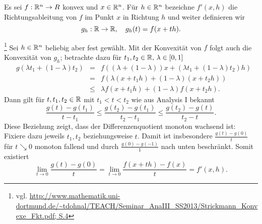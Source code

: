 Es sei $f:\mathbb{R}^n\to R$ konvex und $x\in \mathbb{R}^n$. Für $h\in \mathbb{R}^n$ bezeichne $f'(x,h)$ die Richtungsableitung von $f$ im Punkt $x$ in Richtung $h$ und
weiter definieren wir 
\begin{displaymath}
 g_h:\mathbb{R}\to\mathbb{R},\quad g_h(t)=f(x+th).
\end{displaymath}

\begin{compactenum}[(i)]
 \item \footnote{vgl. \url{http://www.mathematik.uni-dortmund.de/~tdohnal/TEACH/Seminar\_AnaIII\_SS2013/Strickmann\_Konvexe\_Fkt.pdf; S.4}}
 Sei $h\in\mathbb{R}^n$ beliebig aber fest gewählt. Mit der Konvexität von $f$ folgt auch die Konvexität von $g_h$;
 betrachte dazu für $t_1,t_2\in \mathbb{R}, \, \lambda\in[0,1]$
 \begin{align*}
  &g(\lambda t_1+(1-\lambda)t_2)&=& f((\lambda+(1-\lambda))x+(\lambda t_1+(1-\lambda)t_2)h)\\
  &&=& f(\lambda(x+t_1h)+(1-\lambda)(x+t_2h))\\
  &&\leq& \lambda f(x+t_1h)+(1-\lambda)f(x+t_2h).
 \end{align*}
 Dann gilt für $t,t_1,t_2\in \mathbb{R}$ mit $t_1<t<t_2$ wie aus Analysis I bekannt
 \begin{displaymath}
  \frac{g(t)-g(t_1)}{t-t_1}\leq\frac{g(t_2)-g(t_1)}{t_2-t_1}\leq\frac{g(t_2)-g(t)}{t_2-t}.
 \end{displaymath}
 Diese Beziehung zeigt, dass der Differenzenquotient monoton wachsend ist: Fixiere dazu jeweils $t_1,t_2$ beziehungsweise $t$.
 Damit ist insbesondere $\frac{g(t)-g(0)}{t}$ für $t\searrow0$ monoton fallend und durch $\frac{g(0)-g(-1)}{1}$ nach unten beschränkt.
 Somit existiert 
 \begin{displaymath}
  \lim_{t\to 0} \frac{g(t)-g(0)}{t}=\lim_{t\to 0}\frac{f(x+th)-f(x)}{t}=f'(x,h).
 \end{displaymath}
\end{compactenum}


